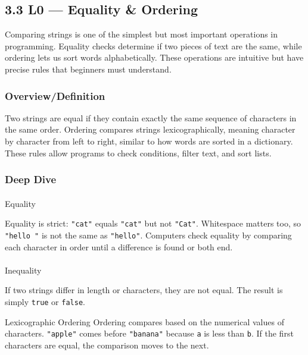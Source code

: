 \documentclass[
  letterpaper,
  DIV=11,
  numbers=noendperiod]{scrreprt}
\makeatletter
\let\oldparagraph\paragraph
\renewcommand{\paragraph}{
    \@ifstar
      \xxxParagraphStar
      \xxxParagraphNoStar
  }
\newcommand{\xxxParagraphStar}[1]{\oldparagraph*{#1}\mbox{}}
\newcommand{\xxxParagraphNoStar}[1]{\oldparagraph{#1}\mbox{}}
\makeatother
\begin{document}
\subsection{3.3 L0 --- Equality \& Ordering}\label{l0-equality-ordering}

Comparing strings is one of the simplest but most important operations
in programming. Equality checks determine if two pieces of text are the
same, while ordering lets us sort words alphabetically. These operations
are intuitive but have precise rules that beginners must understand.

\subsubsection{Overview/Definition}\label{overviewdefinition-1}

Two strings are equal if they contain exactly the same sequence of
characters in the same order. Ordering compares strings
lexicographically, meaning character by character from left to right,
similar to how words are sorted in a dictionary. These rules allow
programs to check conditions, filter text, and sort lists.

\subsubsection{Deep Dive}\label{deep-dive-28}

\paragraph{Equality}\label{equality}

Equality is strict: \texttt{"cat"} equals \texttt{"cat"} but not
\texttt{"Cat"}. Whitespace matters too, so \texttt{"hello\ "} is not the
same as \texttt{"hello"}. Computers check equality by comparing each
character in order until a difference is found or both end.

\paragraph{Inequality}\label{inequality}

If two strings differ in length or characters, they are not equal. The
result is simply \texttt{true} or \texttt{false}.

Lexicographic Ordering Ordering compares based on the numerical values
of characters. \texttt{"apple"} comes before \texttt{"banana"} because
\texttt{\textquotesingle{}a\textquotesingle{}} is less than
\texttt{\textquotesingle{}b\textquotesingle{}}. If the first characters
are equal, the comparison moves to the next.
\end{document}

